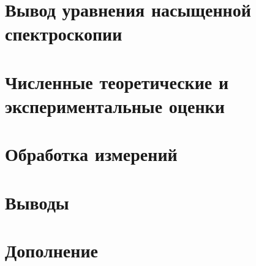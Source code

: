 





\newpage


\section{Вывод уравнения насыщенной спектроскопии}






\newpage
\section{Численные теоретические и экспериментальные оценки}



\newpage
\section{Обработка измерений}



\section{Выводы}



\newpage
\section{Дополнение}





